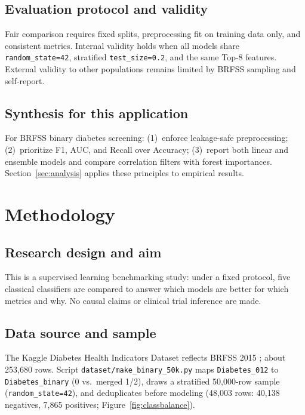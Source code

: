 \documentclass[11pt,a4paper]{article}
\begin{document}
\subsection{Evaluation protocol and validity}\label{sec:theory-eval}

Fair comparison requires fixed splits, preprocessing fit on training data only, and consistent metrics. Internal validity holds when all models share \lstinline{random_state=42}, stratified \lstinline{test_size=0.2}, and the same Top-8 features. External validity to other populations remains limited by BRFSS sampling and self-report.

\subsection{Synthesis for this application}\label{sec:theory-synth}

For BRFSS binary diabetes screening: (1)~enforce leakage-safe preprocessing; (2)~prioritize F1, AUC, and Recall over Accuracy; (3)~report both linear and ensemble models and compare correlation filters with forest importances. Section~\ref{sec:analysis} applies these principles to empirical results.

\section{Methodology}\label{sec:method}

\subsection{Research design and aim}\label{sec:method-design}

This is a supervised learning benchmarking study: under a fixed protocol, five classical classifiers are compared to answer which models are better for which metrics and why. No causal claims or clinical trial inference are made.

\subsection{Data source and sample}\label{sec:method-data}

The Kaggle Diabetes Health Indicators Dataset reflects BRFSS 2015 \citep{TeboulND}; about 253,680 rows. Script \lstinline{dataset/make_binary_50k.py} maps \texttt{Diabetes\_012} to \texttt{Diabetes\_binary} (0 vs.\ merged 1/2), draws a stratified 50,000-row sample (\lstinline{random_state=42}), and deduplicates before modeling (48,003 rows: 40,138 negatives, 7,865 positives; Figure~\ref{fig:classbalance}).
\end{document}
